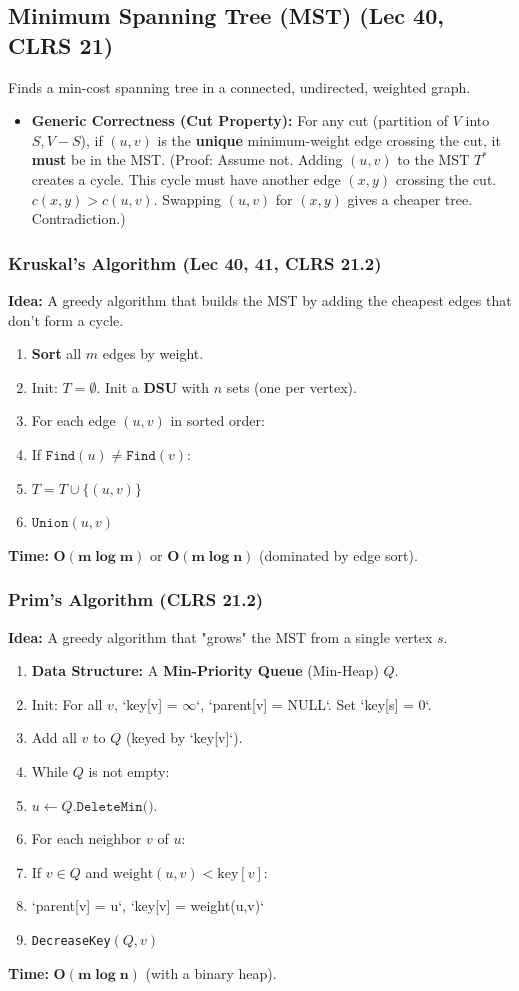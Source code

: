 \subsection{Minimum Spanning Tree (MST) (Lec 40, CLRS 21)}
Finds a min-cost spanning tree in a connected, undirected, weighted graph.
\begin{itemize}
    \item \textbf{Generic Correctness (Cut Property):} For any cut (partition of $V$ into $S, V-S$), if $(u,v)$ is the \textbf{unique} minimum-weight edge crossing the cut, it \textbf{must} be in the MST. (Proof: Assume not. Adding $(u,v)$ to the MST $T^*$ creates a cycle. This cycle must have another edge $(x,y)$ crossing the cut. $c(x,y) > c(u,v)$. Swapping $(u,v)$ for $(x,y)$ gives a cheaper tree. Contradiction.)
\end{itemize}

\subsubsection{Kruskal's Algorithm (Lec 40, 41, CLRS 21.2)}
\textbf{Idea:} A greedy algorithm that builds the MST by adding the cheapest edges that don't form a cycle.
\begin{enumerate}
    \item \textbf{Sort} all $m$ edges by weight.
    \item Init: $T = \emptyset$. Init a \textbf{DSU} with $n$ sets (one per vertex).
    \item For each edge $(u, v)$ in sorted order:
    \item If $\texttt{Find}(u) \neq \texttt{Find}(v)$:
    \item $T = T \cup \{(u, v)\}$
    \item $\texttt{Union}(u, v)$
\end{enumerate}
\textbf{Time:} $\mathbf{O(m \log m)}$ or $\mathbf{O(m \log n)}$ (dominated by edge sort).

\subsubsection{Prim's Algorithm (CLRS 21.2)}
\textbf{Idea:} A greedy algorithm that "grows" the MST from a single vertex $s$.
\begin{enumerate}
    \item \textbf{Data Structure:} A \textbf{Min-Priority Queue} (Min-Heap) $Q$.
    \item Init: For all $v$, `key[v] = $\infty$`, `parent[v] = NULL`. Set `key[s] = 0`.
    \item Add all $v$ to $Q$ (keyed by `key[v]`).
    \item While $Q$ is not empty:
    \item $u \gets Q.\texttt{DeleteMin()}$.
    \item For each neighbor $v$ of $u$:
    \item If $v \in Q$ and $\text{weight}(u,v) < \text{key}[v]$:
    \item `parent[v] = u`, `key[v] = weight(u,v)`
    \item \texttt{DecreaseKey}$(Q, v)$
\end{enumerate}
\textbf{Time:} $\mathbf{O(m \log n)}$ (with a binary heap).

